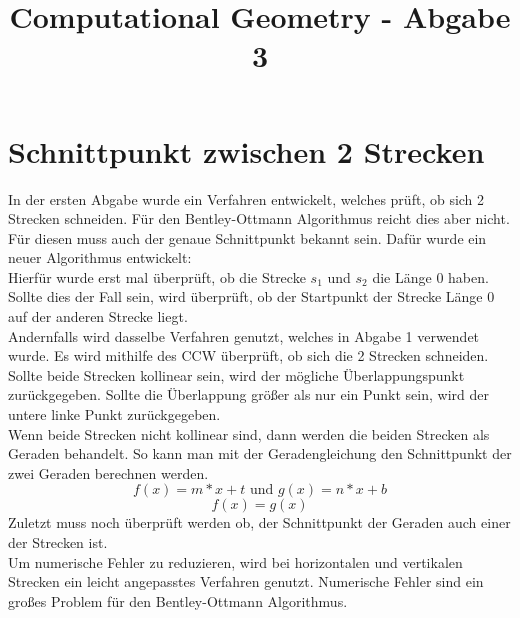 \documentclass[conference]{IEEEtran}
\begin{document}
	
	\title{Computational Geometry - Abgabe 3}
	
	\author{
	}
	
	\maketitle
	


	\section{Schnittpunkt zwischen 2 Strecken }
	In der ersten Abgabe wurde ein Verfahren entwickelt, welches prüft, ob sich 2 Strecken schneiden. Für den Bentley-Ottmann Algorithmus reicht dies aber nicht. Für diesen muss auch der genaue Schnittpunkt bekannt sein.
	Dafür wurde ein neuer Algorithmus entwickelt:\\
	Hierfür wurde erst mal überprüft, ob die Strecke $s_1$ und $s_2$ die Länge 0 haben. Sollte dies der Fall sein, wird überprüft, ob der Startpunkt der Strecke Länge 0 auf der anderen Strecke liegt.\\
	Andernfalls wird dasselbe Verfahren genutzt, welches in Abgabe 1 verwendet wurde. Es wird mithilfe des CCW überprüft, ob sich die 2 Strecken schneiden.\\
	Sollte beide Strecken kollinear sein, wird der mögliche Überlappungspunkt zurückgegeben. Sollte die Überlappung größer als nur ein Punkt sein, wird der untere linke Punkt zurückgegeben.\\
	Wenn beide Strecken nicht kollinear sind, dann werden die beiden Strecken als Geraden behandelt. So kann man mit der Geradengleichung den Schnittpunkt der zwei Geraden berechnen werden.\\
	\[ f(x) = m*x+t \text{ und } g(x) = n*x+b \]
	\[ f(x) = g(x) \]
	Zuletzt muss noch überprüft werden ob, der Schnittpunkt der Geraden auch einer der Strecken ist.\\
	Um numerische Fehler zu reduzieren, wird bei horizontalen und vertikalen Strecken ein leicht angepasstes Verfahren genutzt. Numerische Fehler sind ein großes Problem für den Bentley-Ottmann Algorithmus.
\end{document}
